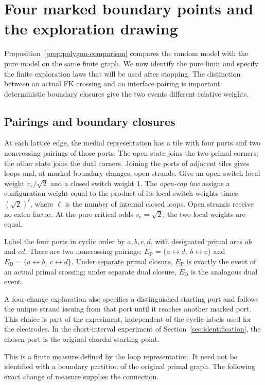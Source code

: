 \section{Four marked boundary points and the exploration drawing}\label{sec:pure}

Proposition~\ref{prop:polygon-comparison} compares the random model with
the pure model on the same finite graph. We now identify the pure limit
and specify the finite exploration laws that will be used after stopping.
The distinction between an actual FK crossing and an interface pairing is
important: deterministic boundary closures give the two events different
relative weights.

\subsection{Pairings and boundary closures}

At each lattice edge, the medial representation has a tile with four
ports and two noncrossing pairings of those ports. The open state joins
the two primal corners; the other state joins the dual corners.
Joining the ports of adjacent tiles gives loops and, at marked boundary
changes, open strands. Give an open switch local weight $v_e/\sqrt2$
and a closed switch weight $1$. The \emph{open-cap law} assigns a
configuration weight equal to the product of its local switch weights
times $(\sqrt2)^{\ell}$, where $\ell$ is the number of internal closed
loops. Open strands receive no extra factor. At the pure critical odds
$v_e=\sqrt2$, the two local weights are equal.

Label the four ports in cyclic order by $a,b,c,d$, with designated
primal arcs $ab$ and $cd$. There are two noncrossing pairings:
$E_{\mathrm P}=\{a\leftrightarrow d,\ b\leftrightarrow c\}$ and
$E_{\mathrm D}=\{a\leftrightarrow b,\ c\leftrightarrow d\}$.
Under separate primal closure, $E_{\mathrm P}$ is exactly the event of
an actual primal crossing; under separate dual closure,
$E_{\mathrm D}$ is the analogous dual event.

A four-change exploration also specifies a distinguished starting
port and follows the unique strand issuing from that port until it
reaches another marked port. This choice is part of the experiment,
independent of the cyclic labels used for the electrodes. In the
short-interval experiment of Section~\ref{sec:identification}, the
chosen port is the original chordal starting point.

This is a finite measure defined by the loop representation. It need not
be identified with a boundary partition of the original primal graph.
The following exact change of measure supplies the connection.

